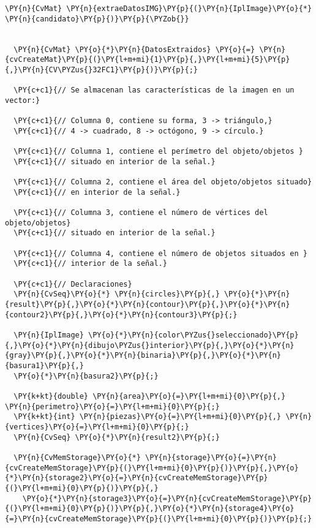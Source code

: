 \begin{Verbatim}[commandchars=\\\{\}]
\PY{n}{CvMat} \PY{n}{extraeDatosIMG}\PY{p}{(}\PY{n}{IplImage}\PY{o}{*} \PY{n}{candidato}\PY{p}{)}\PY{p}{\PYZob{}}
  
  
  \PY{n}{CvMat} \PY{o}{*}\PY{n}{DatosExtraidos} \PY{o}{=} \PY{n}{cvCreateMat}\PY{p}{(}\PY{l+m+mi}{1}\PY{p}{,}\PY{l+m+mi}{5}\PY{p}{,}\PY{n}{CV\PYZus{}32FC1}\PY{p}{)}\PY{p}{;}
  
  \PY{c+c1}{// Se almacenan las características de la imagen en un vector:}
  
  \PY{c+c1}{// Columna 0, contiene su forma, 3 -> triángulo,}
  \PY{c+c1}{// 4 -> cuadrado, 8 -> octógono, 9 -> círculo.}

  \PY{c+c1}{// Columna 1, contiene el perímetro del objeto/objetos }
  \PY{c+c1}{// situado en interior de la señal.}

  \PY{c+c1}{// Columna 2, contiene el área del objeto/objetos situado}
  \PY{c+c1}{// en interior de la señal.}

  \PY{c+c1}{// Columna 3, contiene el número de vértices del objeto/objetos}
  \PY{c+c1}{// situado en interior de la señal.}

  \PY{c+c1}{// Columna 4, contiene el número de objetos situados en }
  \PY{c+c1}{// interior de la señal.}

  \PY{c+c1}{// Declaraciones}
  \PY{n}{CvSeq}\PY{o}{*} \PY{n}{circles}\PY{p}{,} \PY{o}{*}\PY{n}{result}\PY{p}{,}\PY{o}{*}\PY{n}{contour}\PY{p}{,}\PY{o}{*}\PY{n}{contour2}\PY{p}{,}\PY{o}{*}\PY{n}{contour3}\PY{p}{;}

  \PY{n}{IplImage} \PY{o}{*}\PY{n}{color\PYZus{}seleccionado}\PY{p}{,}\PY{o}{*}\PY{n}{dibujo\PYZus{}interior}\PY{p}{,}\PY{o}{*}\PY{n}{gray}\PY{p}{,}\PY{o}{*}\PY{n}{binaria}\PY{p}{,}\PY{o}{*}\PY{n}{basura1}\PY{p}{,}
  \PY{o}{*}\PY{n}{basura2}\PY{p}{;}  

  \PY{k+kt}{double} \PY{n}{area}\PY{o}{=}\PY{l+m+mi}{0}\PY{p}{,} \PY{n}{perimetro}\PY{o}{=}\PY{l+m+mi}{0}\PY{p}{;}
  \PY{k+kt}{int} \PY{n}{piezas}\PY{o}{=}\PY{l+m+mi}{0}\PY{p}{,} \PY{n}{vertices}\PY{o}{=}\PY{l+m+mi}{0}\PY{p}{;}
  \PY{n}{CvSeq} \PY{o}{*}\PY{n}{result2}\PY{p}{;}

  \PY{n}{CvMemStorage}\PY{o}{*} \PY{n}{storage}\PY{o}{=}\PY{n}{cvCreateMemStorage}\PY{p}{(}\PY{l+m+mi}{0}\PY{p}{)}\PY{p}{,}\PY{o}{*}\PY{n}{storage2}\PY{o}{=}\PY{n}{cvCreateMemStorage}\PY{p}{(}\PY{l+m+mi}{0}\PY{p}{)}\PY{p}{,}
    \PY{o}{*}\PY{n}{storage3}\PY{o}{=}\PY{n}{cvCreateMemStorage}\PY{p}{(}\PY{l+m+mi}{0}\PY{p}{)}\PY{p}{,}\PY{o}{*}\PY{n}{storage4}\PY{o}{=}\PY{n}{cvCreateMemStorage}\PY{p}{(}\PY{l+m+mi}{0}\PY{p}{)}\PY{p}{;}
  

\end{Verbatim}
